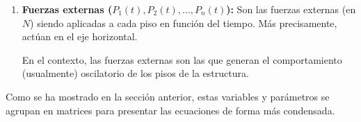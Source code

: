 \begin{enumerate}
    \item \textbf{Fuerzas externas (\(P_1(t), P_2(t), \ldots, P_n(t)\)):} Son las fuerzas externas (en \(\si{N}\)) siendo aplicadas a cada piso en función del tiempo. Más precisamente, actúan en el eje horizontal.

        En el contexto, las fuerzas externas son las que generan el comportamiento (usualmente) oscilatorio de los pisos de la estructura.

\end{enumerate}

Como se ha mostrado en la sección anterior, estas variables y parámetros se agrupan en matrices para presentar las ecuaciones de forma más condensada.
